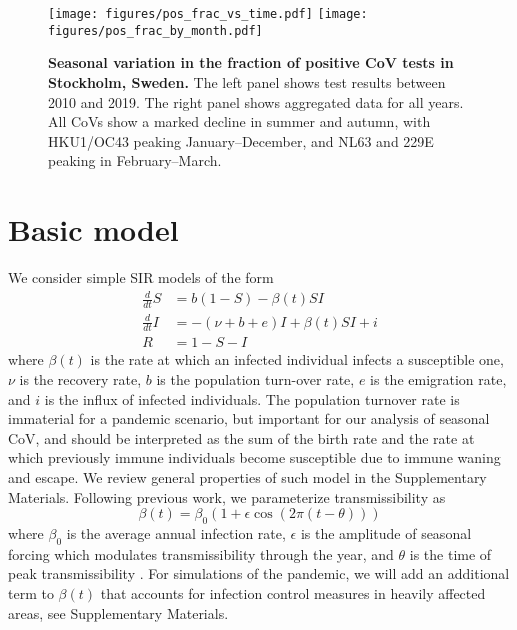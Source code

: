 \documentclass[rmp, reprint, superscriptaddress, floatfix,amsmath]{revtex4-1}
\newcommand{\Jan}[1]{{\color{deepsaffron}Jan: #1}}
\newcommand{\Emma}[1]{{\color{purple}Emma: #1}}
\begin{document}
\begin{figure*}
    \centering
    \texttt{[image: figures/pos\_frac\_vs\_time.pdf]}
    \texttt{[image: figures/pos\_frac\_by\_month.pdf]}
    \caption{{\bf Seasonal variation in the fraction of positive CoV tests in Stockholm, Sweden.} The left panel shows test results between 2010 and 2019. The right panel shows aggregated data for all years. All CoVs show a marked decline in summer and autumn, with HKU1/OC43 peaking January--December, and NL63 and 229E peaking in February--March. %
    }
    \label{fig:seasonal_CoV}
\end{figure*}

\section{Basic model}
We consider simple SIR models \citep{kermack_contributions_1991} of the form 
\begin{equation}
\begin{split}
\frac{d}{dt} S & = b(1-S) - \beta(t) S I \\
\frac{d}{dt} I & = -(\nu+b+e) I + \beta(t) S I + i\\
R & = 1-S-I
\end{split}
\label{eq:SIR}
\end{equation}
where $\beta(t)$ is the rate at which an infected individual infects a susceptible one, $\nu$ is the recovery rate, $b$ is the population turn-over rate, $e$ is the emigration rate, and $i$ is the influx of infected individuals.
The population turnover rate is immaterial for a pandemic scenario, but important for our analysis of seasonal CoV, and should be interpreted as the sum of the birth rate and the rate at which previously immune individuals become susceptible due to immune waning and escape.
We review general properties of such model in the Supplementary Materials. 
Following previous work, we parameterize transmissibility as 
\begin{equation}
\beta(t) = \beta_0\left(1+\epsilon\cos(2\pi (t-\theta))\right)
\label{eq:transmissibility}
\end{equation}
where $\beta_0$ is the average annual infection rate, $\epsilon$ is the amplitude of seasonal forcing which modulates transmissibility through the year, and $\theta$ is the time of peak transmissibility \citep{dushoff_dynamical_2004,chen_regular_2017}.
For simulations of the pandemic, we will add an additional term to $\beta(t)$ that accounts for infection control measures in heavily affected areas, see Supplementary Materials.
\end{document}
